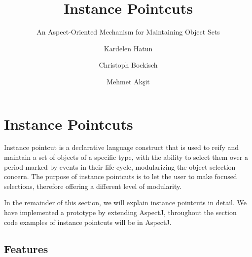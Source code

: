 \documentclass{llncs}
\begin{document}

\title{Instance Pointcuts}
\subtitle{An Aspect-Oriented Mechanism for Maintaining Object Sets}

\author{Kardelen Hatun \and Christoph Bockisch \and Mehmet Ak\c{s}it}

\maketitle



\section{Instance Pointcuts}

Instance pointcut is a declarative language construct that is used to reify and maintain a set of objects of a specific type, with the ability to select them over a period marked by events in their life-cycle, modularizing the object selection concern. The purpose of instance pointcuts is to  let the user to make focused selections, therefore offering a different level of modularity. 
 
In the remainder of this section, we will explain instance pointcuts in detail. We have implemented a prototype by extending AspectJ, throughout the section code examples of instance pointcuts will be in AspectJ.


\subsection{Features}
\end{document}
